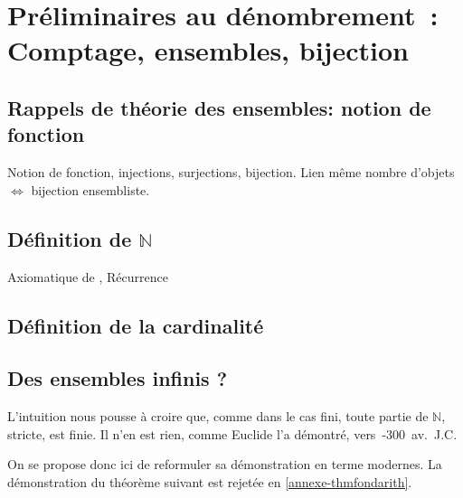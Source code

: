 \documentclass[a4paper,french,final]{memoir}
\begin{document}
\part{Préliminaires au dénombrement~: Comptage, ensembles, bijection}
\chapter{Rappels de théorie des ensembles: notion de fonction}
Notion de fonction, injections, surjections, bijection. 
Lien même nombre d'objets $ \iff$ bijection ensembliste. 
\diagbij
\chapter{\texorpdfstring{Définition de $\mathbb{N}$}{Définition de N}}
Axiomatique de , Récurrence

\chapter{Définition de la cardinalité}
\chapter{Des ensembles infinis ? } 
L'intuition nous pousse à croire que, comme dans le cas fini, toute partie de $\mathbb{N}$, stricte, est finie. Il n'en est rien, comme Euclide l'a démontré, vers~-300~av.~J.C. 

On se propose donc ici de reformuler sa démonstration en terme modernes. 
La démonstration du théorème suivant est rejetée en \cref{annexe-thmfondarith}.
\end{document}
